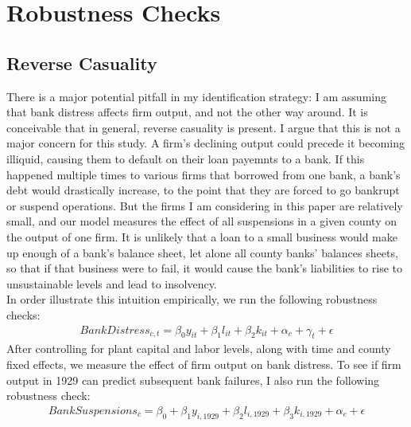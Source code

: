 \documentclass[letter,11pt]{article}
\begin{document}
{\section{Robustness Checks}

\subsection{Reverse Casuality}

There is a major potential pitfall in my identification strategy: I am assuming that bank distress affects firm output, and not the other way around. It is conceivable that in general, reverse casuality is present. I argue that this is not a major concern for this study. A firm's declining output could precede it becoming illiquid, causing them to default on their loan payemnts to a bank. If this happened multiple times to various firms that borrowed from one bank, a bank's debt would drastically increase, to the point that they are forced to go bankrupt or suspend operations. But the firms I am considering in this paper are relatively small, and our model measures the effect of all suspensions in a given county on the output of one firm. It is unlikely that a loan to a small business would make up enough of a bank's balance sheet, let alone all county banks' balances sheets, so that if that business were to fail, it would cause the bank's liabilities to rise to unsustainable levels and lead to insolvency. 
\\
\indent In order illustrate this intuition empirically, we run the following robustness checks:
\begin{align*}
BankDistress_{c,t} = \beta_0 y_{it} + \beta_1 l_{it} + \beta_2 k_{it} + \alpha_c + \gamma_t + \epsilon
\end{align*}
After controlling for plant capital and labor levels, along with time and county fixed effects, we measure the effect of firm output on bank distress. To see if firm output in 1929 can predict subsequent bank failures, I also run the following robustness check:
\begin{align*}
BankSuspensions_c  =  \beta_0+ \beta_1 y_{i, 1929} + \beta_2 l_{i, 1929} + \beta_3 k_{i, 1929} + \alpha_c  + \epsilon
\end{align*}

}
\end{document}
